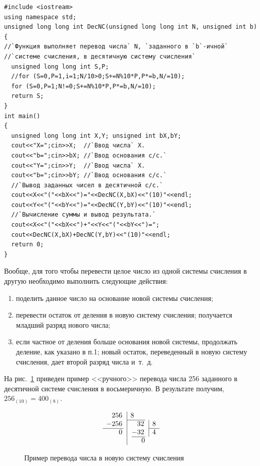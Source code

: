 \begin{lstlisting}
#include <iostream>
using namespace std;
unsigned long long int DecNC(unsigned long long int N, unsigned int b)
{
//`Функция выполняет перевод числа` N, `заданного в `b`-ичной`
//`системе счисления, в десятичную систему счисления`
  unsigned long long int S,P;
  //for (S=0,P=1,i=1;N/10>0;S+=N%10*P,P*=b,N/=10);
  for (S=0,P=1;N!=0;S+=N%10*P,P*=b,N/=10);
  return S;
}
int main()
{
  unsigned long long int X,Y; unsigned int bX,bY;
  cout<<"X=";cin>>X;  //`Ввод числа` X.
  cout<<"b=";cin>>bX; //`Ввод основания с/с.`
  cout<<"Y=";cin>>Y;  //`Ввод числа` X.
  cout<<"b=";cin>>bY; //`Ввод основания с/с.`
  //`Вывод заданных чисел в десятичной с/с.`
  cout<<X<<"("<<bX<<")="<<DecNC(X,bX)<<"(10)"<<endl;
  cout<<Y<<"("<<bY<<")="<<DecNC(Y,bY)<<"(10)"<<endl;
  //`Вычисление суммы и вывод результата.`
  cout<<X<<"("<<bX<<")+"<<Y<<"("<<bY<<")=";
  cout<<DecNC(X,bX)+DecNC(Y,bY)<<"(10)"<<endl;
  return 0;
}
\end{lstlisting}



Вообще, для того чтобы перевести целое число из одной системы счисления в другую необходимо выполнить следующие
действия:

\begin{enumerate}
\item поделить данное число на основание новой системы счисления;
\item перевести остаток от деления в новую систему счисления; получается младший разряд нового числа;
\item если частное от деления больше основания новой системы, продолжать деление, как указано в п.1; новый остаток,
переведенный в новую систему счисления, дает второй разряд числа и~т.~д.
\end{enumerate}
На рис.~\ref{ch04:refDrawing0} 
приведен пример <<ручного>> перевода числа 256 заданного в десятичной системе 
счисления в восьмеричную. В
результате получим,  $256_{(10)}=400_{(8)}$.
\begin{figure}[h]
\begin{minipage}[b]{0.5\textwidth}
$$
\begin{array}{r@{\,}l|l@{\,}l@{\,}l|l}
256 && \multicolumn{4}{l}8\\\cline{3-4}
- 256 &&& \phantom{-}32 &&8\\\cline{1-1}\cline{6-6}
 0 &&& - 32 && 4 \\\cline{4-4}
  && \multicolumn{4}{c}0\\
\end{array}
$$
\caption{Пример перевода числа в новую систему счисления}
\label{ch04:refDrawing0}
\end{minipage}
\end{figure}

